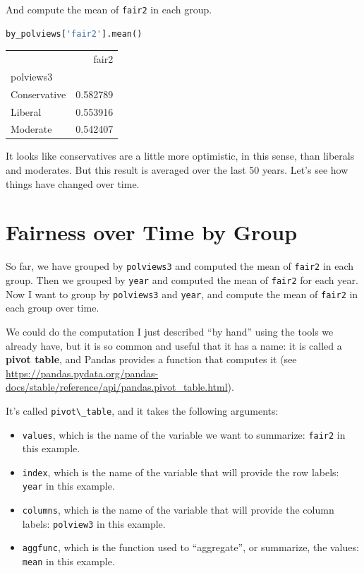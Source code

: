 And compute the mean of \passthrough{\lstinline!fair2!} in each group.

\begin{lstlisting}[language=Python]
by_polviews['fair2'].mean()
\end{lstlisting}

\begin{tabular}{lr}
\toprule
{} &     fair2 \\
polviews3    &           \\
\midrule
Conservative &  0.582789 \\
Liberal      &  0.553916 \\
Moderate     &  0.542407 \\
\bottomrule
\end{tabular}

It looks like conservatives are a little more optimistic, in this sense,
than liberals and moderates. But this result is averaged over the last
50 years. Let's see how things have changed over time.

\hypertarget{fairness-over-time-by-group}{%
\section{Fairness over Time by
Group}\label{fairness-over-time-by-group}}

So far, we have grouped by \passthrough{\lstinline!polviews3!} and
computed the mean of \passthrough{\lstinline!fair2!} in each group. Then
we grouped by \passthrough{\lstinline!year!} and computed the mean of
\passthrough{\lstinline!fair2!} for each year. Now I want to group by
\passthrough{\lstinline!polviews3!} and \passthrough{\lstinline!year!},
and compute the mean of \passthrough{\lstinline!fair2!} in each group
over time.

We could do the computation I just described ``by hand'' using the tools
we already have, but it is so common and useful that it has a name: it
is called a \textbf{pivot table}, and Pandas provides a function that
computes it (see
\url{https://pandas.pydata.org/pandas-docs/stable/reference/api/pandas.pivot_table.html}).

It's called \passthrough{\lstinline!pivot\_table!}, and it takes the
following arguments:

\begin{itemize}
\item
  \passthrough{\lstinline!values!}, which is the name of the variable we
  want to summarize: \passthrough{\lstinline!fair2!} in this example.
\item
  \passthrough{\lstinline!index!}, which is the name of the variable
  that will provide the row labels: \passthrough{\lstinline!year!} in
  this example.
\item
  \passthrough{\lstinline!columns!}, which is the name of the variable
  that will provide the column labels:
  \passthrough{\lstinline!polview3!} in this example.
\item
  \passthrough{\lstinline!aggfunc!}, which is the function used to
  ``aggregate'', or summarize, the values:
  \passthrough{\lstinline!mean!} in this example.
\end{itemize}

